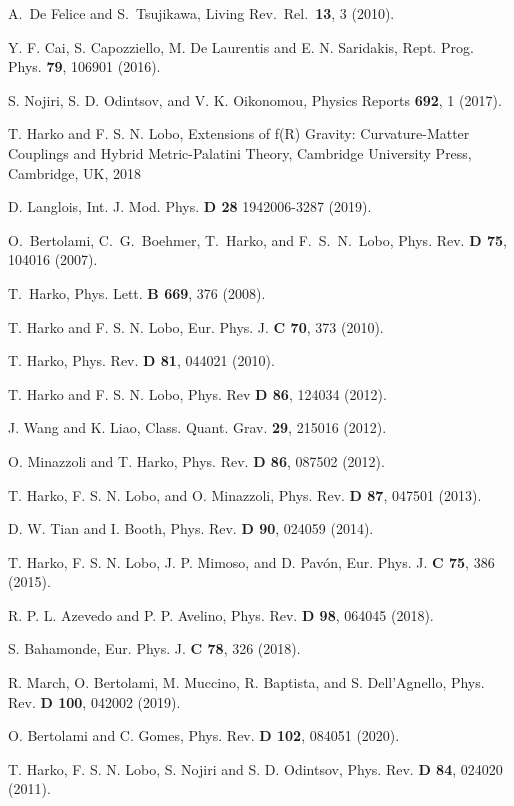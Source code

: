 \documentclass[aps,superscriptaddress, showpacs,preprintnumbers, superscriptaddress, nofootinbibt,twocolumn]{revtex4}
\begin{document}
\begin{thebibliography}{99}
 A.~De Felice and S.~Tsujikawa, %
Living Rev.\ Rel.\ \textbf{13}, 3 (2010).

 Y. F. Cai, S. Capozziello, M. De Laurentis and E. N.
Saridakis, Rept. Prog. Phys. {\bf 79}, 106901 (2016).

 S. Nojiri, S. D. Odintsov, and V. K.  Oikonomou, Physics Reports {\bf  692},  1 (2017).

 T. Harko and F. S. N. Lobo, Extensions of f(R) Gravity:
Curvature-Matter Couplings and Hybrid Metric-Palatini Theory, Cambridge University Press, Cambridge, UK, 2018

 D. Langlois, Int. J. Mod. Phys. {\bf D 28} 1942006-3287 (2019).

 O.~Bertolami, C.~G.~Boehmer, T.~Harko, and F.~S.~N.~Lobo, Phys. Rev. \textbf{ D 75}, 104016 (2007).

 T.~Harko, Phys. Lett. \textbf{B 669}, 376 (2008).

 T. Harko and F. S. N. Lobo,  Eur. Phys. J. {\bf C 70}, 373 (2010).

 T. Harko, Phys. Rev. \textbf{D 81}, 044021 (2010).

 T. Harko and F. S. N. Lobo, Phys. Rev {\bf D 86}, 124034 (2012).

 J. Wang and K. Liao,  Class. Quant. Grav. {\bf 29},  215016 (2012).

 O. Minazzoli and T. Harko, Phys. Rev. {\bf D 86}, 087502 (2012).

 T. Harko, F. S. N. Lobo, and O. Minazzoli, Phys. Rev. {\bf D 87}, 047501 (2013).

 D. W. Tian and I. Booth, Phys. Rev. {\bf D 90},  024059 (2014).

 T. Harko, F. S. N. Lobo, J. P. Mimoso, and D. Pav\'{o}n, Eur. Phys. J. {\bf C 75},  386 (2015).

 R. P. L. Azevedo and P. P. Avelino, Phys. Rev. {\bf D 98}, 064045 (2018).

 S. Bahamonde, Eur. Phys. J. {\bf C  78}, 326 (2018).

 R. March, O. Bertolami, M. Muccino, R. Baptista, and S. Dell'Agnello, Phys. Rev. {\bf D 100}, 042002 (2019).

 O. Bertolami and C. Gomes, Phys. Rev. {\bf D 102}, 084051 (2020).

  T. Harko, F. S. N. Lobo, S. Nojiri and S. D. Odintsov,  Phys. Rev. {\bf D 84},  024020 (2011).


\end{thebibliography}
\end{document}
